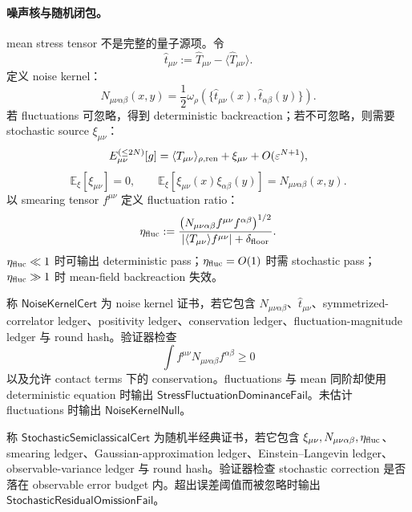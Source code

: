 \paragraph{噪声核与随机闭包。}
mean stress tensor 不是完整的量子源项。令
\[
\widehat t_{\mu\nu}
:=
\widehat T_{\mu\nu}
-
\langle\widehat T_{\mu\nu}\rangle.
\]
定义 noise kernel：
\[
\boxed{
N_{\mu\nu\alpha\beta}(x,y)
=
\frac12
\omega_\rho\!\left(
\{\widehat t_{\mu\nu}(x),\widehat t_{\alpha\beta}(y)\}
\right).
}
\]
若 fluctuations 可忽略，得到 deterministic backreaction；若不可忽略，则需要 stochastic source \(\xi_{\mu\nu}\)：
\[
E_{\mu\nu}^{(\le2N)}[g]
=
\langle T_{\mu\nu}\rangle_{\rho,{\rm ren}}
+\xi_{\mu\nu}
+O(\varepsilon^{N+1}),
\]
\[
\mathbb E_\xi[\xi_{\mu\nu}]=0,
\qquad
\mathbb E_\xi[\xi_{\mu\nu}(x)\xi_{\alpha\beta}(y)]
=
N_{\mu\nu\alpha\beta}(x,y).
\]
以 smearing tensor \(f^{\mu\nu}\) 定义 fluctuation ratio：
\[
\eta_{\rm fluc}
:=
\frac{
\left(N_{\mu\nu\alpha\beta}f^{\mu\nu}f^{\alpha\beta}\right)^{1/2}
}{
\left|\langle T_{\mu\nu}\rangle f^{\mu\nu}\right|+\delta_{\rm floor}
}.
\]
\(\eta_{\rm fluc}\ll1\) 时可输出 deterministic pass；\(\eta_{\rm fluc}=O(1)\) 时需 stochastic pass；\(\eta_{\rm fluc}\gg1\) 时 mean-field backreaction 失效。

\begin{definition}\label{def:typed-address-biaxial-completion-noise-kernel-cert}
称 \(\mathsf{NoiseKernelCert}\) 为 noise kernel 证书，若它包含 \(N_{\mu\nu\alpha\beta}\)、\(\widehat t_{\mu\nu}\)、symmetrized-correlator ledger、positivity ledger、conservation ledger、fluctuation-magnitude ledger 与 round hash。验证器检查
\[
\int f^{\mu\nu}N_{\mu\nu\alpha\beta}f^{\alpha\beta}\ge0
\]
以及允许 contact terms 下的 conservation。fluctuations 与 mean 同阶却使用 deterministic equation 时输出 \(\mathsf{StressFluctuationDominanceFail}\)。未估计 fluctuations 时输出 \(\mathsf{NoiseKernelNull}\)。
\end{definition}

\begin{definition}[随机半经典证书]\label{def:typed-address-biaxial-completion-stochastic-semiclassical-cert}
称 \(\mathsf{StochasticSemiclassicalCert}\) 为随机半经典证书，若它包含 \(\xi_{\mu\nu},N_{\mu\nu\alpha\beta},\eta_{\rm fluc}\)、smearing ledger、Gaussian-approximation ledger、Einstein--Langevin ledger、observable-variance ledger 与 round hash。验证器检查 stochastic correction 是否落在 observable error budget 内。超出误差阈值而被忽略时输出 \(\mathsf{StochasticResidualOmissionFail}\)。
\end{definition}

